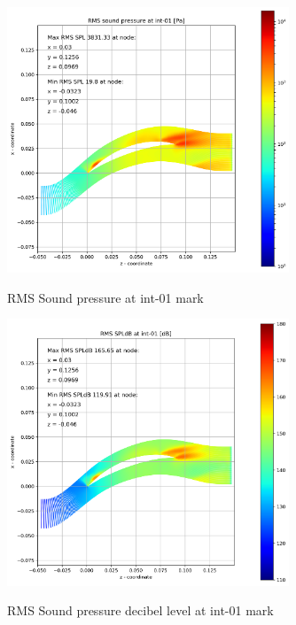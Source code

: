 \begin{figure}[ht]
  \centering
  \includegraphics[width=0.75\textwidth]{Figures/int-01-rms-spl.png} \label{int-01-rms-spl}
  \caption{RMS Sound pressure at int-01 mark}
  
  \vspace*{\floatsep}%

  \includegraphics[width=0.75\textwidth]{Figures/int-01-rms-spldb.png} \label{int-01-rms-spldb}
  \caption{RMS Sound pressure decibel level at int-01 mark}
\end{figure}

